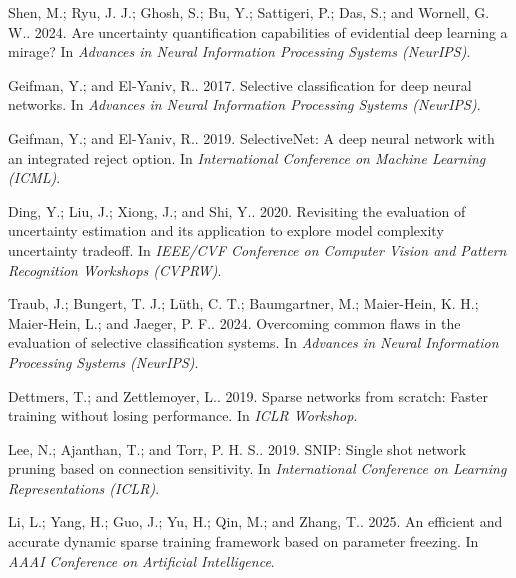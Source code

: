 Shen, M.; Ryu, J. J.; Ghosh, S.; Bu, Y.; Sattigeri, P.; Das, S.; and Wornell, G. W.. 2024. 
\newblock Are uncertainty quantification capabilities of evidential deep learning a mirage? In {\em Advances in Neural Information Processing Systems (NeurIPS)}.

Geifman, Y.; and El-Yaniv, R.. 2017. 
\newblock Selective classification for deep neural networks. In {\em Advances in Neural Information Processing Systems (NeurIPS)}.

Geifman, Y.; and El-Yaniv, R.. 2019. 
\newblock SelectiveNet: A deep neural network with an integrated reject option. In {\em International Conference on Machine Learning (ICML)}.

Ding, Y.; Liu, J.; Xiong, J.; and Shi, Y.. 2020. 
\newblock Revisiting the evaluation of uncertainty estimation and its application to explore model complexity uncertainty tradeoff. In {\em IEEE/CVF Conference on Computer Vision and Pattern Recognition Workshops (CVPRW)}.

Traub, J.; Bungert, T. J.; L{\"u}th, C. T.; Baumgartner, M.; Maier-Hein, K. H.; Maier-Hein, L.; and Jaeger, P. F.. 2024. 
\newblock Overcoming common flaws in the evaluation of selective classification systems. In {\em Advances in Neural Information Processing Systems (NeurIPS)}.

Dettmers, T.; and Zettlemoyer, L.. 2019. 
\newblock Sparse networks from scratch: Faster training without losing performance. In {\em ICLR Workshop}.

Lee, N.; Ajanthan, T.; and Torr, P. H. S.. 2019. 
\newblock SNIP: Single shot network pruning based on connection sensitivity. In {\em International Conference on Learning Representations (ICLR)}.

Li, L.; Yang, H.; Guo, J.; Yu, H.; Qin, M.; and Zhang, T.. 2025. 
\newblock An efficient and accurate dynamic sparse training framework based on parameter freezing. In {\em AAAI Conference on Artificial Intelligence}.

